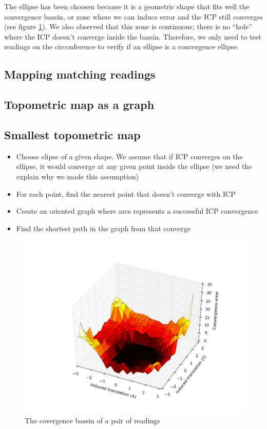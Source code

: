 \documentclass[letterpaper,10 pt,conference]{ieeeconf}
\begin{document}
The ellipse has been choosen because it is a geometric shape that fits well the convergence bassin, or zone where we can induce error and the ICP still
converges (see figure \ref{convergence_bassin}). We also observed that this zone is continuous; there is no ``hole'' where the ICP doesn't converge inside the bassin.
Therefore, we only need to test readings on the circonference to verify if an ellipse is a convergence ellipse.

\subsection{Mapping matching readings}

\subsection{Topometric map as a graph}

\subsection{Smallest topometric map}

\begin{itemize}
  \item Choose elipse of a given shape. We assume that if ICP converges on the
    ellipse, it would converge at any given point inside the ellipse (we need the explain why we made this assumption)

  \item For each point, find the nearest point that doesn't converge with ICP

  \item Create an oriented graph where arcs represents a successful ICP convergence

  \item Find the shortest path in the graph from that converge

\end{itemize}

\begin{figure}
  \centering
  \includegraphics[scale=0.4]{convergence_bassin}
  \caption{The covergence bassin of a pair of readings}
  \label{convergence_bassin}
\end{figure}
\end{document}
